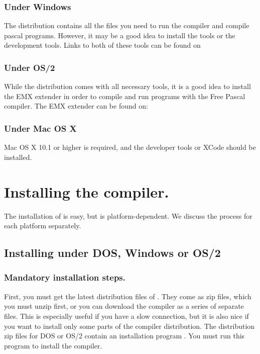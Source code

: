\subsubsection{Under Windows}
The \windows distribution contains all the files you need to run the compiler
and compile pascal programs. However, it may be a good idea to install
the  tools or the  development tools. Links
to both of these tools can be found on 

\subsubsection{Under OS/2}
While the \fpc distribution comes with all necessary tools, it is a good
idea to install the EMX extender in order to compile and run
programs with the Free Pascal compiler. The EMX extender can be found on:\\

\subsubsection{Under Mac OS X}
Mac OS X 10.1 or higher is required, and the developer tools or XCode 
should be installed.

\section{Installing the compiler.}
The installation of \fpc is easy, but is platform-dependent.
We discuss the process for each platform separately.

\subsection{Installing under DOS, Windows or OS/2}
\subsubsection{Mandatory installation steps.}
First, you must get the latest distribution files of \fpc. They come as zip
files, which you must unzip first, or you can download the compiler as a
series of separate files. This is especially useful if you have a slow
connection, but it is also nice if you want to install only some parts of the
compiler distribution.  The distribution zip files for DOS or OS/2 contain an
installation program . You must run this program to install
the compiler.

